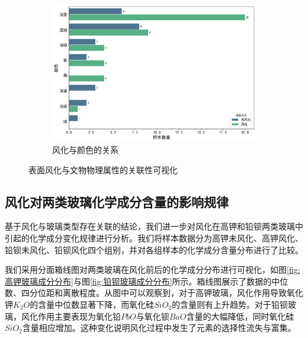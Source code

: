 \begin{figure}[H]
	\begin{subfigure}[b]{0.8\textwidth}
		\centering
		\includegraphics[width=\textwidth]{figs/3问题一/风化与颜色的关系.png}
		\caption{风化与颜色的关系}
		\label{fig:relation_color}

	\end{subfigure}

	\caption{表面风化与文物物理属性的关联性可视化}
	\label{fig:关系分析可视化_all}
\end{figure}


\subsection{风化对两类玻璃化学成分含量的影响规律}

基于风化与玻璃类型存在关联的结论，我们进一步对风化在高钾和铅钡两类玻璃中引起的化学成分变化规律进行分析。我们将样本数据分为高钾未风化、高钾风化、铅钡未风化、铅钡风化四个组别，并对各组样本的化学成分含量分布进行了比较。

我们采用分面箱线图对两类玻璃在风化前后的化学成分分布进行可视化，如图\ref{fig:高钾玻璃成分分布}与图\ref{fig:铅钡玻璃成分分布}所示。箱线图展示了数据的中位数、四分位距和离散程度。从图中可以观察到，对于高钾玻璃，风化作用导致氧化钾$K_2O$的含量中位数显著下降，而氧化硅$SiO_2$的含量则有上升趋势。对于铅钡玻璃，风化作用主要表现为氧化铅$PbO$与氧化钡$BaO$含量的大幅降低，同时氧化硅$SiO_2$含量相应增加。这种变化说明风化过程中发生了元素的选择性流失与富集。

